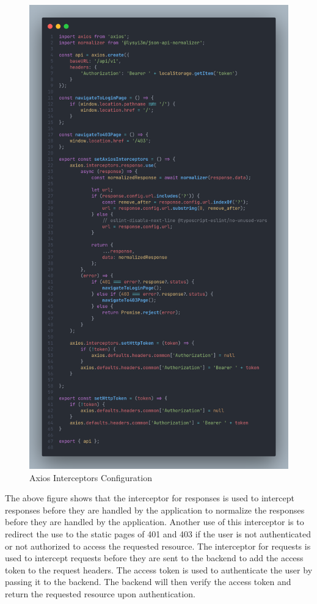 \begin{justify}
        \begin{figure}[H]
            \centerline{\includegraphics[width=135mm,scale=1]{figures/implementation_and_testing/implementation/frontend/axios.png}}
            \caption{Axios Interceptors Configuration}
        \end{figure}

        \vspace{0.25cm}
        \newendline The above figure shows that the interceptor for responses is used to intercept responses before they are handled by the application to normalize the responses before they are handled by the application. Another use of this interceptor is to redirect the use to the static pages of 401 and 403 if the user is not authenticated or not authorized to access the requested resource.  The interceptor for requests is used to intercept requests before they are sent to the backend to add the access token to the request headers.  The access token is used to authenticate the user by passing it to the backend.  The backend will then verify the access token and return the requested resource upon authentication.



\end{justify}
